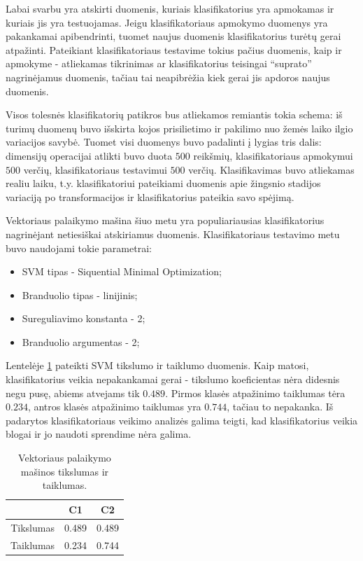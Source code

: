 \documentclass[]{vgtuef}
\begin{document}
Labai svarbu yra atskirti duomenis, kuriais klasifikatorius yra apmokamas ir kuriais jis yra testuojamas. Jeigu klasifikatoriaus apmokymo duomenys yra pakankamai apibendrinti, tuomet naujus duomenis klasifikatorius turėtų gerai atpažinti. Pateikiant klasifikatoriaus testavime tokius pačius duomenis, kaip ir apmokyme - atliekamas tikrinimas ar klasifikatorius teisingai ``suprato'' nagrinėjamus duomenis, tačiau tai neapibrėžia kiek gerai jis apdoros naujus duomenis.

Visos tolesnės klasifikatorių patikros bus atliekamos remiantis tokia schema: iš turimų duomenų buvo išskirta kojos prisilietimo ir pakilimo nuo žemės laiko ilgio variacijos savybė. Tuomet visi duomenys buvo padalinti į lygias tris dalis: dimensijų operacijai atlikti buvo duota $500$ reikšmių, klasifikatoriaus apmokymui $500$ verčių, klasifikatoriaus testavimui $500$ verčių. Klasifikavimas buvo atliekamas realiu laiku, t.y. klasifikatoriui pateikiami duomenis apie žingsnio stadijos variaciją po transformacijos ir klasifikatorius pateikia savo spėjimą.

Vektoriaus palaikymo mašina šiuo metu yra populiariausias klasifikatorius nagrinėjant netiesiškai atskiriamus duomenis. Klasifikatoriaus testavimo metu buvo naudojami tokie parametrai:

\begin{itemize}
\item SVM tipas - Siquential Minimal Optimization;
\item Branduolio tipas - linijinis;
\item Sureguliavimo konstanta - 2;
\item Branduolio argumentas - 2;
\end{itemize}

Lentelėje \ref{table:svm_scores} pateikti SVM tikslumo ir taiklumo duomenis. Kaip matosi, klasifikatorius veikia nepakankamai gerai - tikslumo koeficientas nėra didesnis negu pusę, abiems atvejams tik $0.489$. Pirmos klasės atpažinimo taiklumas tėra $0.234$, antros klasės atpažinimo taiklumas yra $0.744$, tačiau to nepakanka. Iš padarytos klasifikatoriaus veikimo analizės galima teigti, kad klasifikatorius veikia blogai ir jo naudoti sprendime nėra galima.

\begin{table}[!t]
  \centering
  \caption{Vektoriaus palaikymo mašinos tikslumas ir taiklumas.}
  \label{table:svm_scores}
  \begin{tabular}{|c|c|c|} \hline
    & C1 & C2 \\ \hline
    Tikslumas & 0.489 & 0.489 \\ \hline
    Taiklumas & 0.234 & 0.744 \\ \hline
  \end{tabular}
\end{table}
\end{document}
